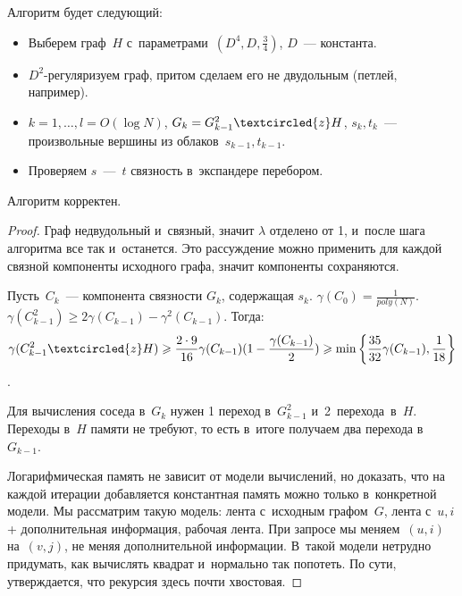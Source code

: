 \documentclass{article}
\begin{document}
Алгоритм будет следующий:
\begin{itemize}
	\item Выберем граф~$H$ с~параметрами~$(D^4, D, \frac{3}{4})$, $D$~---
		константа.
	\item $D^2$-регуляризуем граф, притом сделаем его не двудольным (петлей,
		например).
	\item $k = 1, \ldots, l = O(\log N)$, $G_k = G_{k-1}^2 \textcircled{z} H$,
		$s_k, t_k$~--- произвольные вершины из облаков~$s_{k-1}, t_{k-1}$.
	\item Проверяем $s$~---~$t$ связность в~экспандере перебором.
\end{itemize}

\begin{claim}
	Алгоритм корректен.
\end{claim}
\begin{proof}
	Граф недвудольный и~связный, значит $\lambda$ отделено от 1, и~после шага
	алгоритма все так и~останется. Это рассуждение можно применить для каждой
	связной компоненты исходного графа, значит компоненты сохраняются.

	Пусть~$C_k$~--- компонента связности $G_k$, содержащая $s_k$. $\gamma(C_0) =
	\frac{1}{poly(N)}$. $\gamma(C_{k-1}^2) \ge 2\gamma(C_{k-1}) -
	\gamma^2(C_{k-1})$. Тогда:
	$$\gamma(C_{k-1}^2 \textcircled{z} H) \ge
	\frac{2 \cdot 9}{16} \gamma(C_{k-1})(1 - \frac{\gamma(C_{k-1})}{2}) \ge
	\min\left\{\frac{35}{32}\gamma(C_{k-1}),\frac{1}{18}\right\}$$.

	Для вычисления соседа в~$G_k$ нужен 1 переход в~$G_{k-1}^2$
	и~2~перехода~в~$H$. Переходы в~$H$ памяти не требуют, то есть в~итоге получаем
	два перехода в~$G_{k-1}$.

	Логарифмическая память не зависит от модели вычислений, но доказать, что на
	каждой итерации добавляется константная память можно только в~конкретной
	модели. Мы рассматрим такую модель: лента с~исходным графом~$G$, лента с~$u,
	i$ + дополнительная информация, рабочая лента. При запросе мы меняем~$(u, i)$
	на~$(v, j)$, не меняя дополнительной информации. В~такой модели нетрудно
	придумать, как вычислять квадрат и~нормально так попотеть. По сути,
	утверждается, что рекурсия здесь почти хвостовая.
\end{proof}
\end{document}
